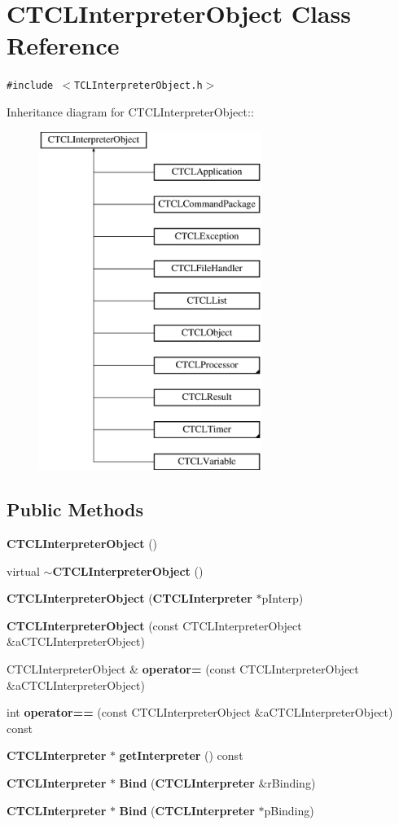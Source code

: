 \section{CTCLInterpreter\-Object  Class Reference}
\label{classCTCLInterpreterObject}
{\tt \#include $<$TCLInterpreter\-Object.h$>$}

Inheritance diagram for CTCLInterpreter\-Object::\begin{figure}[H]
\begin{center}
\leavevmode
\includegraphics[height=11cm]{classCTCLInterpreterObject}
\end{center}
\end{figure}
\subsection*{Public Methods}
\begin{CompactItemize}
\item 
{\bf CTCLInterpreter\-Object} ()
\item 
virtual {\bf $\sim$CTCLInterpreter\-Object} ()
\item 
{\bf CTCLInterpreter\-Object} ({\bf CTCLInterpreter} $\ast$p\-Interp)
\item 
{\bf CTCLInterpreter\-Object} (const CTCLInterpreter\-Object \&a\-CTCLInterpreter\-Object)
\item 
CTCLInterpreter\-Object \& {\bf operator=} (const CTCLInterpreter\-Object \&a\-CTCLInterpreter\-Object)
\item 
int {\bf operator==} (const CTCLInterpreter\-Object \&a\-CTCLInterpreter\-Object) const
\item 
{\bf CTCLInterpreter} $\ast$ {\bf get\-Interpreter} () const
\item 
{\bf CTCLInterpreter} $\ast$ {\bf Bind} ({\bf CTCLInterpreter} \&r\-Binding)
\item 
{\bf CTCLInterpreter} $\ast$ {\bf Bind} ({\bf CTCLInterpreter} $\ast$p\-Binding)
\end{CompactItemize}
